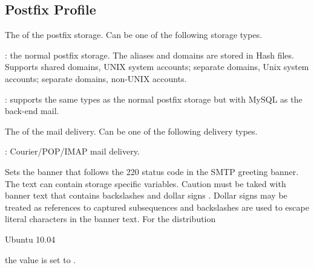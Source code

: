 \label{sec:postfix_profile}
\subsection{Postfix Profile}


The  of the postfix storage. Can be one of the following 
storage types.
\begin{asparaitem}
%
\item[\qcode{hash}:] 
the normal postfix storage. The aliases and domains are stored in Hash files.
Supports shared domains, UNIX system accounts;
separate domains, Unix system accounts; separate domains, non-UNIX accounts.
%
\item[\qcode{postfix}:] supports the same types as the normal 
postfix storage but with MySQL as the back-end mail.
%
\end{asparaitem}


The  of the mail delivery. Can be one of the following 
delivery types.
\begin{asparaitem}
%
\item[\qcode{courier}:] 
Courier/POP/IMAP mail delivery.
%
\end{asparaitem}


Sets the banner  that follows the 220 status code in the SMTP 
greeting banner. The text can contain storage specific variables. Caution
must be taked with banner text that contains backslashes \qcode{\textbackslash} and 
dollar signs \qcode{\$}. Dollar signs may be treated as references to 
captured subsequences and backslashes are used to escape literal characters 
in the banner text.
For the distribution
\begin{inparaitem}
\item[\TheDistribution{ubuntu}] Ubuntu 10.04
\end{inparaitem}
the value is set to .



